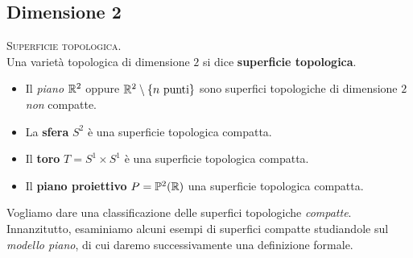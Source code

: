 	\subsection{Dimensione 2}
\begin{define}\textsc{Superficie topologica.}\\
	Una varietà topologica di dimensione $2$ si dice \textbf{superficie topologica}.
\end{define}
\begin{examples}
	\begin{itemize}
		\item Il \textit{piano} $\mathbb{R}^2$ oppure $\mathbb{R}^2\setminus \{n\text{ punti}\}$ sono superfici topologiche di dimensione $2$ \textit{non} compatte.
		\item La \textbf{sfera} $S^2$ è una superficie topologica compatta.
		\item Il \textbf{toro} $T=S^1\times S^1$ è una superficie topologica compatta.
		\item Il \textbf{piano proiettivo} $P=\mathbb{P}^2(\mathbb{R})$ una superficie topologica compatta.
	\end{itemize}
\vspace{-3mm}
\end{examples}
Vogliamo dare una classificazione delle superfici topologiche \textit{compatte}. Innanzitutto, esaminiamo alcuni esempi di superfici compatte studiandole sul \textit{modello piano}, di cui daremo successivamente una definizione formale.
